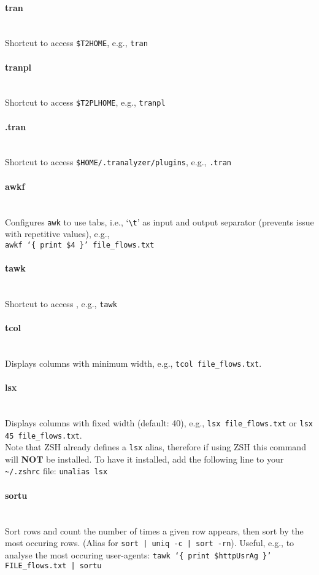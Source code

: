 \documentclass[documentation]{subfiles}
\begin{document}
\paragraph{tran}~\\
Shortcut to access {\tt\$T2HOME}, e.g., {\tt tran}
\paragraph{tranpl}~\\
Shortcut to access {\tt\$T2PLHOME}, e.g., {\tt tranpl}
\paragraph{.tran}~\\
Shortcut to access {\tt\$HOME/.tranalyzer/plugins}, e.g., {\tt .tran}
\paragraph{awkf}~\\
Configures {\tt awk} to use tabs, i.e., `{\tt\textbackslash{}t}' as input and output separator (prevents issue with repetitive values), e.g.,\\
{\tt awkf `\{ print \$4 \}' file\_flows.txt}
\paragraph{tawk}~\\
Shortcut to access , e.g., {\tt tawk}
\paragraph{tcol}~\\
Displays columns with minimum width, e.g., {\tt tcol file\_flows.txt}.
\paragraph{lsx}~\\
Displays columns with fixed width (default: 40), e.g., {\tt lsx file\_flows.txt} or {\tt lsx 45 file\_flows.txt}.\\
Note that ZSH already defines a {\tt lsx} alias, therefore if using ZSH this command will {\bf NOT} be installed.
To have it installed, add the following line to your {\tt \textasciitilde{}/.zshrc} file: {\tt unalias lsx}
\paragraph{sortu}~\\
Sort rows and count the number of times a given row appears, then sort by the most occuring rows.
(Alias for {\tt sort | uniq -c | sort -rn}).
Useful, e.g., to analyse the most occuring user-agents: {\tt tawk `\{ print \$httpUsrAg \}' FILE\_flows.txt | sortu}
\end{document}
